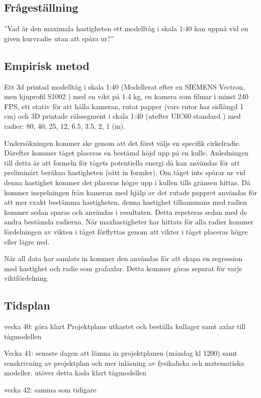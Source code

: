 \subsection{Frågeställning}
''Vad är den maximala hastigheten ett modelltåg i skala 1:40 kan uppnå vid en given kurvradie utan att spåra ur?''

\subsection{Empirisk metod}
Ett 3d printad modelltåg i skala 1:40 (Modellerat efter en SIEMENS Vectron, men hjuprofil S1002 \parencite{}) med en vikt på \num{1.4} kg, en kamera som filmar i minst 240 FPS, ett stativ för att hålla kameran, rutat papper (vars rutor har sidlängd 1 cm) och 3D printade rälssegment i skala 1:40 (utefter UIC60 standard \parencite{}) med radier: 80, 40, 25, 12, \num{6.5}, \num{3.5}, 2, 1 (m). 

Undersökningen kommer ske genom att det först väljs en specifik cirkelradie. Därefter kommer tåget placeras en bestämd höjd upp på en kulle. Anledningen till detta är att formeln för tågets potentiella energi då kan användas för att preliminärt beräkna hastigheten (sätt in formler). Om tåget inte spårar ur vid denna hastighet kommer det placeras högre upp i kullen tills gränsen hittas. Då kommer inspelningen från kameran med hjälp av det rutade pappret användas för att mer exakt bestämma hastigheten, denna hastighet tillsammans med radien kommer sedan sparas och användas i resultaten. Detta repeteras sedan med de andra bestämda radierna. När maxhastigheter har hittats för alla radier kommer fördelningen av vikten i tåget förflyttas genom att vikter i tåget placeras högre eller lägre ned. 

När all data har samlats in kommer den användas för att skapa en regression med hastighet och radie som grafaxlar. Detta kommer göras separat för varje viktfördelning. 

\subsection{Tidsplan}
vecka 40:
göra klart Projektplans utkastet och beställa kullager samt axlar till tågmodellen

Vecka 41: senaste dagen att lämna in projektplanen (måndag kl 1200) samt renskrivning av projektplan och mer inläsning av fysikaliska och matematiska modeller. utöver detta kada klart tågmodellen

vecka 42: samma som tidigare

